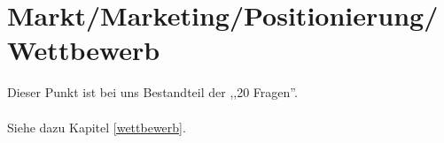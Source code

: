 \chapter{Markt/Marketing/Positionierung/Wettbewerb}
Dieser Punkt ist bei uns Bestandteil der ,,20 Fragen''.
\\
\\
Siehe dazu Kapitel \ref{wettbewerb}.
